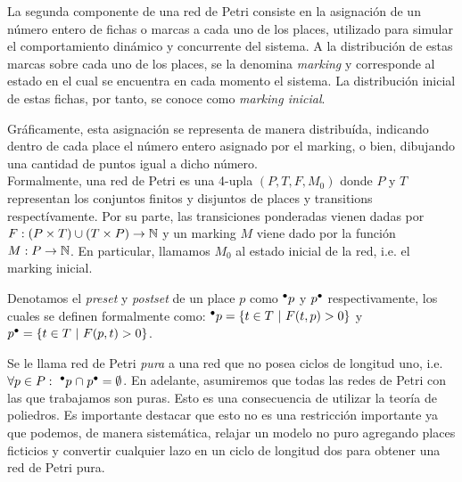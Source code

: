 La segunda componente de una red de Petri consiste en la asignación
de un número entero de fichas o marcas a cada uno de los places, 
utilizado para simular el comportamiento dinámico y concurrente del sistema.
A la distribución de estas marcas sobre cada uno de los places, se la denomina
\textit{marking} y corresponde al estado en el cual se encuentra en cada momento el sistema.
La distribución inicial de estas fichas, por tanto, se conoce como \textit{marking inicial}.

Gráficamente, esta asignación se representa de manera distribuída, indicando dentro 
de cada place el número entero asignado por el marking, o bien, dibujando una 
cantidad de puntos igual a dicho número.
\\

Formalmente, una red de Petri es una 4-upla $(P,T,F,M_0)$ donde $P$ y $T$\footnotemark[1]
representan los conjuntos finitos y disjuntos de places y transitions respectívamente.
Por su parte, las transiciones ponderadas vienen dadas por \mbox{$F:(P \times T) \cup (T \times P)  \to \mathbb{N}$}
y un marking $M$ viene dado por la función \mbox{$M:P \to \mathbb{N}$}.
En particular, llamamos $M_0$ al estado inicial de la red, i.e. el marking inicial.


Denotamos el \textit{preset} y \textit{postset} de un place $p$ como $\mbox{$^\bullet p$}$ y $\mbox{$p^\bullet$}$ respectivamente,
los cuales se definen formalmente como: $\mbox{$^\bullet p$} =  \{t \in T ~|~ F(t,p) > 0 \}$
y $\mbox{$p^\bullet$} = \{t \in T ~|~ F(p,t) > 0 \}$.

Se le llama red de Petri \emph{pura} a una red que no posea ciclos de longitud uno, i.e.
$\forall p \in P:~ {\mbox{$^\bullet p$}} \mathrel{\cap} {\mbox{$p^\bullet$}} = \emptyset$.
En adelante, asumiremos que todas las redes de Petri con las que trabajamos son puras.
Esto es una consecuencia de utilizar la teoría de poliedros. Es importante destacar que esto no es una 
restricción importante ya que podemos, de manera sistemática, relajar un modelo no puro agregando
places ficticios y convertir cualquier lazo en un ciclo de longitud dos para obtener una red de Petri pura.
\\

